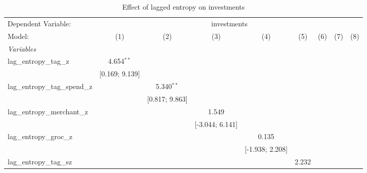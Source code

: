 
\begin{table}[htbp]
   \centering
   \tiny
   \begin{threeparttable}[b]
      \caption{\label{tab:reg_investments_lagged} Effect of lagged entropy on investments}
      \begin{tabular}{lcccccccc}
         \tabularnewline \midrule \midrule
         Dependent Variable: & \multicolumn{8}{c}{investments}\\
         Model:                           & (1)              & (2)              & (3)              & (4)              & (5)              & (6)              & (7)              & (8)\\  
         \midrule
         \emph{Variables}\\
         lag\_entropy\_tag\_z             & 4.654$^{**}$     &                  &                  &                  &                  &                  &                  &   \\   
                                          & [0.169; 9.139]   &                  &                  &                  &                  &                  &                  &   \\   
         lag\_entropy\_tag\_spend\_z      &                  & 5.340$^{**}$     &                  &                  &                  &                  &                  &   \\   
                                          &                  & [0.817; 9.863]   &                  &                  &                  &                  &                  &   \\   
         lag\_entropy\_merchant\_z        &                  &                  & 1.549            &                  &                  &                  &                  &   \\   
                                          &                  &                  & [-3.044; 6.141]  &                  &                  &                  &                  &   \\   
         lag\_entropy\_groc\_z            &                  &                  &                  & 0.135            &                  &                  &                  &   \\   
                                          &                  &                  &                  & [-1.938; 2.208]  &                  &                  &                  &   \\   
         lag\_entropy\_tag\_sz            &                  &                  &                  &                  & 2.232            &                  &                  &   \\   

\end{tabular}
\end{threeparttable}
\end{table}

